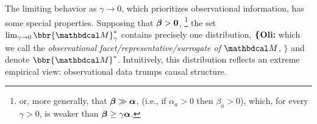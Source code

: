 \documentclass{article}
\newcommand\obslimit{observational facet} %
\newcommand\voli[1]{{\color{olicolor}\textbf{$\boldsymbol\{$Oli: }#1 \textbf{$\boldsymbol\}$}}}
\begin{document}
The limiting behavior as $\gamma \to 0$, which prioritizes observational information, has some special properties.
Supposing that $\boldsymbol\beta > \mathbf{0}$,%
    \footnote{or, more generally, that $\boldsymbol\beta \gg \boldsymbol\alpha$,
        (i.e., if $\alpha_a>0$ then $\beta_a>0$), 
        which, for every $\gamma > 0$, is weaker than $\boldsymbol\beta \ge \gamma \boldsymbol\alpha$. }
the set $\lim_{\gamma\to 0}\bbr{\dg M}_\gamma^*$ contains precisely one
distribution, 
\voli{which we call the 
    \emph{\obslimit/representative/surrogate of $\dg M$},}
and denote $\bbr{\dg M}^*$.
Intuitively, this distribution
reflects an extreme empirical
view: observational data trumps causal structure.
\end{document}
